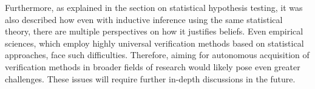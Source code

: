 \documentclass{book}
\begin{document}

Furthermore, as explained in the section on statistical hypothesis testing, it was also described how even with inductive inference using the same statistical theory, there are multiple perspectives on how it justifies beliefs. Even empirical sciences, which employ highly universal verification methods based on statistical approaches, face such difficulties. Therefore, aiming for autonomous acquisition of verification methods in broader fields of research would likely pose even greater challenges. These issues will require further in-depth discussions in the future.

\end{document}
